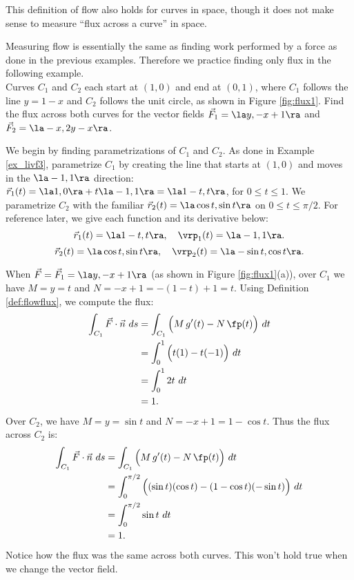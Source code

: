 This definition of flow also holds for curves in space, though it does not make sense to measure ``flux across a curve'' in space.

Measuring flow is essentially the same as finding work performed by a force as done in the previous examples. Therefore we practice finding only flux in the following example.\\

{Curves $C_1$ and $C_2$ each start at $(1,0)$ and end at $(0,1)$, where $C_1$ follows the line $y=1-x$ and $C_2$ follows the unit circle, as shown in Figure \ref{fig:flux1}. Find the flux across both curves for the vector fields $\vec F_1 = \la y, -x+1\ra$ and $\vec F_2 = \la -x, 2y-x\ra$. 
}
{%
We begin by finding parametrizations of $C_1$ and $C_2$. As done in Example \ref{ex_livf3}, parametrize $C_1$ by creating the line that starts at $(1,0)$ and moves in the $\la -1,1\ra$ direction: $\vec r_1(t) = \la 1,0\ra + t\la -1,1\ra = \la 1-t, t\ra$, for $0\leq t\leq 1$. We parametrize $C_2$ with the familiar $\vec r_2(t) = \la \cos t,\sin t\ra$ on $0\leq t\leq \pi/2$. For reference later, we give each function and its derivative below:
$$ \vec r_1(t) = \la 1-t, t\ra, \quad \vrp_1(t) = \la -1,1\ra.$$
$$\vec r_2(t) = \la \cos t, \sin t\ra, \quad \vrp_2(t) = \la -\sin t ,\cos t\ra.$$

When $\vec F = \vec F_1 = \la y, -x+1\ra$ (as shown in Figure \ref{fig:flux1}(a)), over $C_1$ we have $M = y =t$ and $N = -x+1 = -(1-t)+1 = t$. Using Definition \ref{def:flowflux}, we compute the flux:
\begin{align*}
\int_{C_1} \vec F\cdot \vec n\ ds & = \int_{C_1} \Big(M\,g'(t) - N\,\fp(t)\Big)\ dt\\
			&= \int_0^1 \Big( t(1) - t(-1)\Big)\ dt \\
			&= \int_0^1 2t\ dt\\
			&= 1.
\end{align*}
Over $C_2$, we have $M = y = \sin t$ and $N = -x+1 = 1-\cos t$. Thus the flux across $C_2$ is:
\begin{align*}
\int_{C_1} \vec F\cdot \vec n\ ds & = \int_{C_1} \Big(M\,g'(t) - N\,\fp(t)\Big)\ dt\\
				&= \int_0^{\pi/2}\Big((\sin t)(\cos t) - (1-\cos t)(-\sin t)\Big)\ dt\\
				&= \int_0^{\pi/2} \sin t\ dt\\
				&=1.
\end{align*}
Notice how the flux was the same across both curves. This won't hold true when we change the vector field.
\drawexampleline%

}
